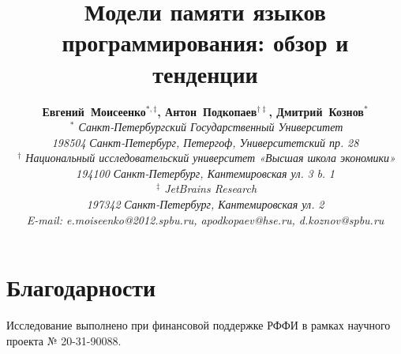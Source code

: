 \documentclass[a4paper,twoside,11pt]{article}
\author{
{\bfseries Евгений~Моисеенко$^{*, \ddagger}$, Антон~Подкопаев$^{\dagger \ddagger}$, Дмитрий~Кознов$^{*}$}
\\ {\itshape $~^{*}$ Санкт-Петербургский Государственный Университет}
\\ {\slshape 198504} {\itshape Санкт-Петербург, Петергоф, Университетский пр.} {\slshape 28}
\\ {\itshape $~^{\dagger}$ Национальный исследовательский университет «Высшая школа экономики»}
\\ {\slshape 194100} {\itshape Санкт-Петербург, Кантемировская ул.} {\slshape 3} {\itshape b.} {\slshape 1}
\\ {\itshape $~^{\ddagger}$ JetBrains Research}
\\ {\slshape 197342} {\itshape Санкт-Петербург, Кантемировская ул.} {\slshape 2}
\\ {\itshape E-mail: e.moiseenko@2012.spbu.ru, apodkopaev@hse.ru, d.koznov@spbu.ru}}
\title{Модели памяти языков программирования: обзор и тенденции}
\date{}
\numberwithin{equation}{section}
\begin{document}
\maketitle











\section*{Благодарности}

Исследование выполнено при финансовой поддержке РФФИ в рамках научного проекта № 20-31-90088.

 
%  




\clearpage
\appendix


\end{document}
